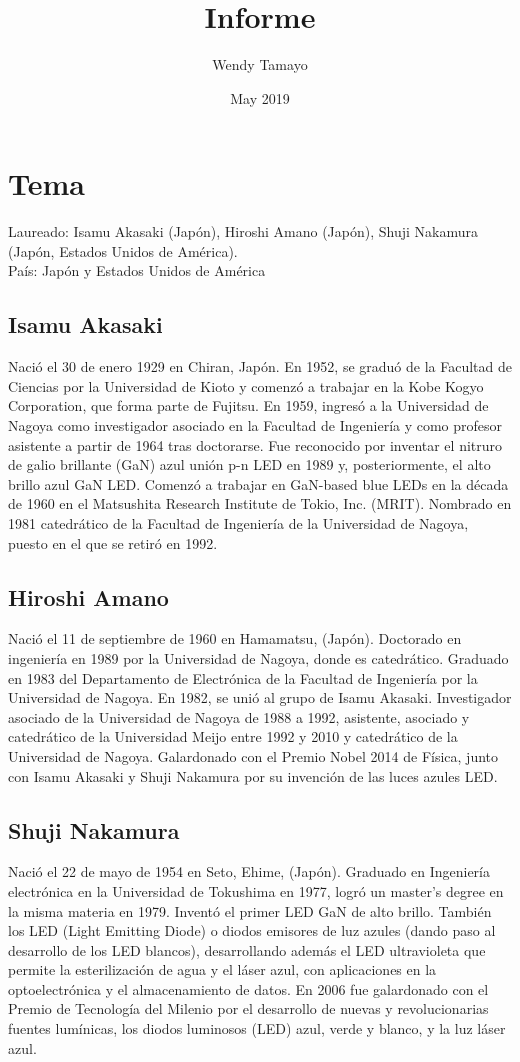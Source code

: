 \documentclass{article}
\title{Informe}
\author{Wendy Tamayo }
\date{May 2019}
\begin{document}
\maketitle

\section{Tema}
Laureado: Isamu Akasaki (Japón), Hiroshi Amano (Japón), Shuji Nakamura (Japón, Estados Unidos de América).\\
País: Japón y Estados Unidos de América
\subsection{Isamu Akasaki }
Nació el 30 de enero 1929 en Chiran, Japón. En 1952, se graduó de la Facultad de Ciencias por la Universidad de Kioto y comenzó a trabajar en la Kobe Kogyo Corporation, que forma parte de Fujitsu. En 1959, ingresó a la Universidad de Nagoya como investigador asociado en la Facultad de Ingeniería y como profesor asistente a partir de 1964 tras doctorarse. Fue reconocido por inventar el nitruro de galio brillante (GaN) azul unión p-n LED en 1989 y, posteriormente, el alto brillo azul GaN LED. Comenzó a trabajar en GaN-based blue LEDs en la década de 1960 en el Matsushita Research Institute de Tokio, Inc. (MRIT). Nombrado en 1981 catedrático de la Facultad de Ingeniería de la Universidad de Nagoya, puesto en el que se retiró en 1992.
\subsection{Hiroshi Amano}
Nació el 11 de septiembre de 1960 en Hamamatsu, (Japón). Doctorado en ingeniería en 1989 por la Universidad de Nagoya, donde es catedrático. Graduado en 1983 del Departamento de Electrónica de la Facultad de Ingeniería por la Universidad de Nagoya. En 1982, se unió al grupo de Isamu Akasaki. Investigador asociado de la Universidad de Nagoya de 1988 a 1992, asistente, asociado y catedrático de la Universidad Meijo entre 1992 y 2010 y catedrático de la Universidad de Nagoya. Galardonado con el Premio Nobel 2014 de Física, junto con Isamu Akasaki y Shuji Nakamura por su invención de las luces azules LED.
\subsection{Shuji Nakamura}
Nació el 22 de mayo de 1954 en Seto, Ehime, (Japón). Graduado en Ingeniería electrónica en la Universidad de Tokushima en 1977, logró un master's degree en la misma materia en 1979. Inventó el primer LED GaN de alto brillo. También los LED (Light Emitting Diode) o diodos emisores de luz azules (dando paso al desarrollo de los LED blancos), desarrollando además el LED ultravioleta que permite la esterilización de agua y el láser azul, con aplicaciones en la optoelectrónica y el almacenamiento de datos. En 2006 fue galardonado con el Premio de Tecnología del Milenio por el desarrollo de nuevas y revolucionarias fuentes lumínicas, los diodos luminosos (LED) azul, verde y blanco, y la luz láser azul. 
\end{document}
